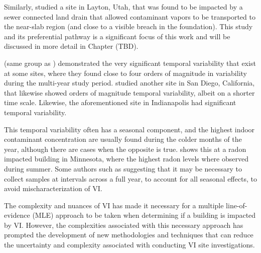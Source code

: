 Similarly, \citeauthor{guo_identification_2015}\cite{guo_identification_2015} studied a site in Layton, Utah, that was found to be impacted by a sewer connected land drain that allowed contaminant vapors to be transported to the near-slab region (and close to a visible breach in the foundation).
This study and its preferential pathway is a significant focus of this work and will be discussed in more detail in Chapter (TBD).\par

\citeauthor{holton_temporal_2013}\cite{holton_temporal_2013} (same group as \citeauthor{guo_identification_2015}) demonstrated the very significant temporal variability that exist at some sites, where they found close to four orders of magnitude in variability during the multi-year study period.
\citeauthor{hosangadi_high-frequency_2017}\cite{hosangadi_high-frequency_2017} studied another site in San Diego, California, that likewise showed orders of magnitude temporal variability, albeit on a shorter time scale.
Likewise, the aforementioned site in Indianapolis had significant temporal variability\cite{schumacher_fluctuation_2012}.\par

This temporal variability often has a seasonal component, and the highest indoor contaminant concentration are usually found during the colder months of the year\cite{schumacher_fluctuation_2012,holton_temporal_2013}, although there are cases when the opposite is true. %
\cite{steck_indoor_2004}\cite{steck_indoor_2004} shows this at a radon impacted building in Minnesota, where the highest radon levels where observed during summer.
Some authors such as \citeauthor{bekele_influence_2014}\cite{bekele_influence_2014} suggesting that it may be necessary to collect samples at intervals across a full year, to account for all seasonal effects, to avoid mischaracterization of VI.\par

The complexity and nuances of VI has made it necessary for a multiple line-of-evidence (MLE) approach to be taken when determining if a building is impacted by VI\cite{u.s._environmental_protection_agency_oswer_2015,pennell_field_2016}.
However, the complexities associated with this necessary approach has prompted the development of new methodologies and techniques that can reduce the uncertainty and complexity associated with conducting VI site investigations.
